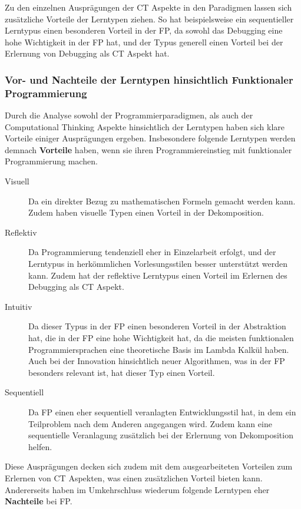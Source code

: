 Zu den einzelnen Ausprägungen der CT Aspekte in den Paradigmen lassen sich zusätzliche Vorteile der Lerntypen ziehen. So hat beispielsweise ein sequentieller Lerntypus einen besonderen Vorteil in der FP, da sowohl das Debugging eine hohe Wichtigkeit in der FP hat, und der Typus generell einen Vorteil bei der Erlernung von Debugging als CT Aspekt hat.

\subsubsection{Vor- und Nachteile der Lerntypen hinsichtlich Funktionaler Programmierung}
Durch die Analyse sowohl der Programmierparadigmen, als auch der Computational Thinking Aspekte hinsichtlich der Lerntypen haben sich klare Vorteile einiger Ausprägungen ergeben.
Insbesondere folgende Lerntypen werden demnach \textbf{Vorteile} haben, wenn sie ihren Programmiereinstieg mit funktionaler Programmierung machen.

\begin{description}
    \item[Visuell] Da ein direkter Bezug zu mathematischen Formeln gemacht werden kann. Zudem haben visuelle Typen einen Vorteil in der Dekomposition.
    \item[Reflektiv] Da Programmierung tendenziell eher in Einzelarbeit erfolgt, und der Lerntypus in herkömmlichen Vorlesungsstilen besser unterstützt werden kann. Zudem hat der reflektive Lerntypus einen Vorteil im Erlernen des Debugging als CT Aspekt.
    \item[Intuitiv] Da dieser Typus in der FP einen besonderen Vorteil in der Abstraktion hat, die in der FP eine hohe Wichtigkeit hat, da die meisten funktionalen Programmiersprachen eine theoretische Basis im Lambda Kalkül haben. Auch bei der Innovation hinsichtlich neuer Algorithmen, was in der FP besonders relevant ist, hat dieser Typ einen Vorteil.
    \item[Sequentiell] Da FP einen eher sequentiell veranlagten Entwicklungsstil hat, in dem ein Teilproblem nach dem Anderen angegangen wird. Zudem kann eine sequentielle Veranlagung zusätzlich bei der Erlernung von Dekomposition helfen.
\end{description}

Diese Ausprägungen decken sich zudem mit dem ausgearbeiteten Vorteilen zum Erlernen von CT Aspekten, was einen zusätzlichen Vorteil bieten kann.
\\
Andererseits haben im Umkehrschluss wiederum folgende Lerntypen eher \textbf{Nachteile} bei FP.

